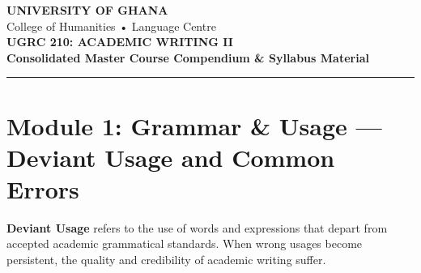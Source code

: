 \documentclass[11pt, a4paper]{article}
\begin{document}
\begin{center}
    {\Large \textbf{UNIVERSITY OF GHANA}}\\[3pt]
    {\large College of Humanities • Language Centre}\\[6pt]
    {\Large \textbf{\color{primaryblue}UGRC 210: ACADEMIC WRITING II}}\\[4pt]
    {\textbf{Consolidated Master Course Compendium \& Syllabus Material}}\\[2pt]
    \rule{\linewidth}{1pt}
\end{center}

\tableofcontents
\vspace{1em}
\newpage

\section{Module 1: Grammar \& Usage --- Deviant Usage and Common Errors}

\textbf{Deviant Usage} refers to the use of words and expressions that depart from accepted academic grammatical standards. When wrong usages become persistent, the quality and credibility of academic writing suffer.
\end{document}

